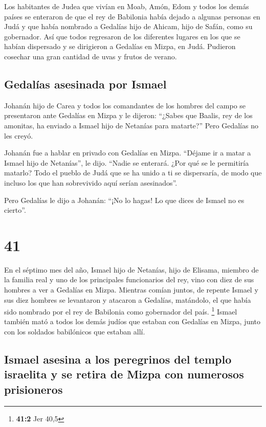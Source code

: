  Los habitantes de Judea que vivían en Moab, Amón, Edom y
todos los demás países se enteraron de que el rey de Babilonia había
dejado a algunas personas en Judá y que había nombrado a Gedalías hijo
de Ahicam, hijo de Safán, como su gobernador.  Así que
todos regresaron de los diferentes lugares en los que se habían
dispersado y se dirigieron a Gedalías en Mizpa, en Judá. Pudieron
cosechar una gran cantidad de uvas y frutos de verano.

\hypertarget{gedaluxedas-asesinada-por-ismael}{%
\subsection{Gedalías asesinada por
Ismael}\label{gedaluxedas-asesinada-por-ismael}}

 Johanán hijo de Carea y todos los comandantes de los
hombres del campo se presentaron ante Gedalías en Mizpa 
y le dijeron: ``¿Sabes que Baalis, rey de los amonitas, ha enviado a
Ismael hijo de Netanías para matarte?'' Pero Gedalías no les creyó.

 Johanán fue a hablar en privado con Gedalías en Mizpa.
``Déjame ir a matar a Ismael hijo de Netanías'', le dijo. ``Nadie se
enterará. ¿Por qué se le permitiría matarlo? Todo el pueblo de Judá que
se ha unido a ti se dispersaría, de modo que incluso los que han
sobrevivido aquí serían asesinados''.

 Pero Gedalías le dijo a Johanán: ``¡No lo hagas! Lo que
dices de Ismael no es cierto''.

\hypertarget{section-40}{%
\section{41}\label{section-40}}

 En el séptimo mes del año, Ismael hijo de Netanías, hijo
de Elisama, miembro de la familia real y uno de los principales
funcionarios del rey, vino con diez de sus hombres a ver a Gedalías en
Mizpa. Mientras comían juntos,  de repente Ismael y sus
diez hombres se levantaron y atacaron a Gedalías, matándolo, el que
había sido nombrado por el rey de Babilonia como gobernador del país.
\footnote{\textbf{41:2} Jer 40,5}  Ismael también mató a
todos los demás judíos que estaban con Gedalías en Mizpa, junto con los
soldados babilónicos que estaban allí.

\hypertarget{ismael-asesina-a-los-peregrinos-del-templo-israelita-y-se-retira-de-mizpa-con-numerosos-prisioneros}{%
\subsection{Ismael asesina a los peregrinos del templo israelita y se
retira de Mizpa con numerosos
prisioneros}\label{ismael-asesina-a-los-peregrinos-del-templo-israelita-y-se-retira-de-mizpa-con-numerosos-prisioneros}}

